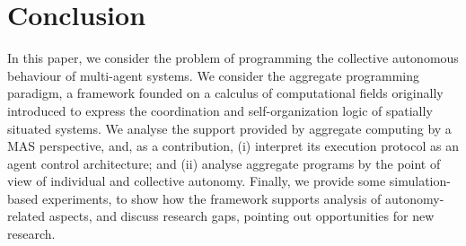 \section{Conclusion} %
\label{mdpi2020:s:conc}

In this paper, we consider the problem
 of programming the collective autonomous behaviour
 of multi-agent systems.
%
We consider the aggregate programming paradigm, 
 a framework
 founded on a calculus of computational fields
 originally introduced 
 to express the coordination 
 and self-organization logic of spatially situated systems.
%
We analyse the support provided by aggregate computing
 by a MAS perspective,
 and, as a contribution, 
 (i) interpret its execution protocol as an agent control architecture; and
 (ii) analyse aggregate programs by the point of view of individual and collective autonomy.
%
Finally, 
 we provide some simulation-based experiments,
 to show how the framework supports
 analysis of autonomy-related aspects,
 and discuss research gaps,
 pointing out opportunities for new research.

